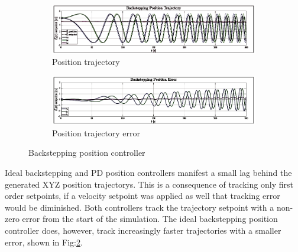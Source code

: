 \begin{figure}[htbp]
\centering
\vspace{-8pt}
\begin{subfigure}{0.9\textwidth}
\centering
\includegraphics[width=\textwidth]{graphs/IBC_Position_Trajectory}
\vspace{-18pt}
\caption{Position trajectory}
\label{fig:ibc_position_trajectory}
\end{subfigure}
\begin{subfigure}{0.9\textwidth}
\centering
\includegraphics[width=\textwidth]{graphs/IBC_Position_Error}
\vspace{-18pt}
\caption{Position trajectory error}
\label{fig:ibc_position_error}
\end{subfigure}
\vspace{-10pt}
\caption{Backstepping position controller}
\label{fig:ibc_position}
\end{figure}
Ideal backstepping and PD position controllers manifest a small lag behind the generated XYZ position trajectorys. This is a consequence of tracking only first order setpoints, if a velocity setpoint was applied as well that tracking error would be diminished. Both controllers track the trajectory setpoint with a non-zero error from the start of the simulation. The ideal backstepping position controller does, however, track increasingly faster trajectories with a smaller error, shown in Fig:\ref{fig:ibc_position_error}.
